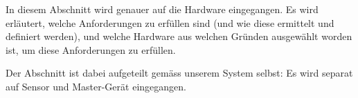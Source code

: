 In  diesem  Abschnitt  wird  genauer auf  die  Hardware  eingegangen. Es  wird
erl\"autert, welche Anforderungen zu erf\"ullen  sind (und wie diese ermittelt
und definiert werden), und welche  Hardware aus welchen Gr\"unden ausgew\"ahlt
worden ist, um diese Anforderungen zu erf\"ullen.

Der Abschnitt  ist dabei  aufgeteilt gem\"ass  unserem System  selbst: Es wird
separat auf Sensor und Master-Ger\"at eingegangen.
